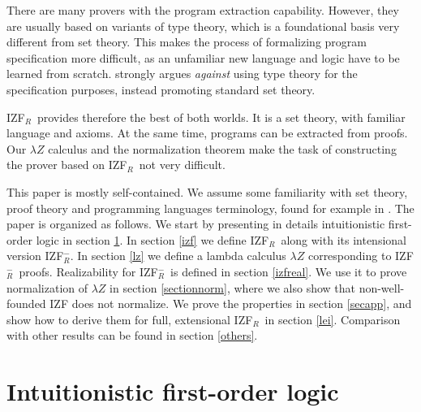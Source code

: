 \documentclass{LMCS}
\newcommand{\izfr}{IZF${}_R$}
\newcommand{\iizfr}{IZF${}_R^{-}$}
\newcommand{\li}{\lambda Z}
\begin{document}
There are many provers with the program extraction capability. However, 
they are usually based on variants of type theory, which is a foundational basis very different from set
theory. This makes the process of formalizing program specification more
difficult, as an unfamiliar new language and logic have to be learned from
scratch. \cite{lamport99} strongly argues \emph{against} using type theory
for the specification purposes, instead promoting standard set theory. 

\izfr\ provides therefore the best of both worlds. It is a set theory,
with familiar language and axioms. At the same time, programs can be
extracted from proofs. Our $\li$ calculus and the normalization
theorem make the task of constructing the prover based on \izfr\ not very
difficult.

This paper is mostly self-contained. We assume some familiarity with
set theory, proof theory and programming languages terminology, found for example 
in \cite{kunen,urzy,pierce}. The paper is organized as follows. We start by presenting in details
intuitionistic first-order logic in section \ref{ifol}. In section \ref{izf} we
define \izfr\ along with its intensional version \iizfr. In section \ref{lz} we define a
lambda calculus $\li$ corresponding to \iizfr\ proofs. Realizability for
\iizfr\ is defined in section \ref{izfreal}. We use it to prove normalization of $\li$ in
section \ref{sectionnorm}, where we also show that non-well-founded IZF does
not normalize. We prove the properties in section \ref{secapp}, and show how to derive them 
for full, extensional \izfr\ in section \ref{lei}. Comparison with other results can be found in section \ref{others}.

\section{Intuitionistic first-order logic}\label{ifol}
\end{document}
